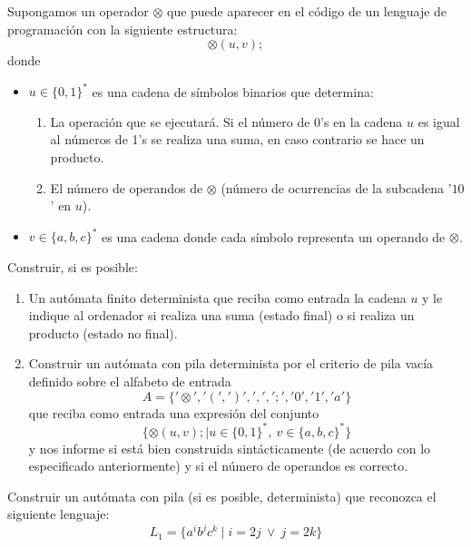 \begin{ejercicio}\label{ej:1.5.24}
    Supongamos un operador $\otimes$ que puede aparecer en el código de un lenguaje de programación con la siguiente estructura:
    \begin{equation*}
        \otimes(u,v);
    \end{equation*}
    donde
    \begin{itemize}
        \item $u\in {\{0,1\}}^{\ast}$ es una cadena de símbolos binarios que determina:
            \begin{enumerate}
                \item La operación que se ejecutará. Si el número de 0's en la cadena $u$ es igual al números de 1's se realiza una suma, en caso contrario se hace un producto.
                \item El número de operandos de $\otimes$ (número de ocurrencias de la subcadena '$10$' en $u$).
            \end{enumerate}
        \item $v\in {\{a,b,c\}}^{\ast}$ es una cadena donde cada símbolo representa un operando de $\otimes$.
    \end{itemize}
    Construir, si es posible:
    \begin{enumerate}
        \item Un autómata finito determinista que reciba como entrada la cadena $u$ y le indique al ordenador si realiza una suma (estado final) o si realiza un producto (estado no final).
        \item Construir un autómata con pila determinista por el criterio de pila vacía definido sobre el alfabeto de entrada
            \begin{equation*}
                A = \{'\otimes', '(', ')', ',', ';', '0', '1', 'a'\}
            \end{equation*}
            que reciba como entrada una expresión del conjunto
            \begin{equation*}
                \{\otimes(u,v); \mid u\in {\{0,1\}}^{\ast},\ v\in {\{a,b,c\}}^{\ast}\}
            \end{equation*}
            y nos informe si está bien construida sintácticamente (de acuerdo con lo especificado anteriormente) y si el número de operandos es correcto.
    \end{enumerate}
\end{ejercicio}

\begin{ejercicio}\label{ej:1.5.25}
    Construir un autómata con pila (si es posible, determinista) que reconozca el siguiente lenguaje:
    \begin{equation*}
        L_1 = \{a^i b^j c^k \mid i = 2j\ \lor\ j = 2k\}
    \end{equation*}
\end{ejercicio}

